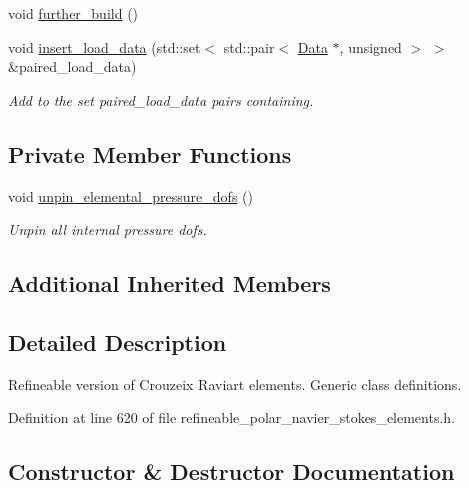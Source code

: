 \begin{DoxyCompactItemize}
void \hyperlink{classoomph_1_1RefineablePolarCrouzeixRaviartElement_a140d5327220a9a7301381d1f53ddd004}{further\+\_\+build} ()
\item 
void \hyperlink{classoomph_1_1RefineablePolarCrouzeixRaviartElement_a4e6ef46186c9167549288db230bd4965}{insert\+\_\+load\+\_\+data} (std\+::set$<$ std\+::pair$<$ \hyperlink{classoomph_1_1Data}{Data} $\ast$, unsigned $>$ $>$ \&paired\+\_\+load\+\_\+data)
\begin{DoxyCompactList}\small\item\em Add to the set {\ttfamily paired\+\_\+load\+\_\+data} pairs containing. \end{DoxyCompactList}\end{DoxyCompactItemize}
\subsection*{Private Member Functions}
\begin{DoxyCompactItemize}
\item 
void \hyperlink{classoomph_1_1RefineablePolarCrouzeixRaviartElement_a672ed3b75ac6408eda52c6789a1c9690}{unpin\+\_\+elemental\+\_\+pressure\+\_\+dofs} ()
\begin{DoxyCompactList}\small\item\em Unpin all internal pressure dofs. \end{DoxyCompactList}\end{DoxyCompactItemize}
\subsection*{Additional Inherited Members}


\subsection{Detailed Description}
Refineable version of Crouzeix Raviart elements. Generic class definitions. 

Definition at line 620 of file refineable\+\_\+polar\+\_\+navier\+\_\+stokes\+\_\+elements.\+h.



\subsection{Constructor \& Destructor Documentation}
\mbox{\label{classoomph_1_1RefineablePolarCrouzeixRaviartElement_a0a3438dcf6d0ca68d81941ab93799023}} 
